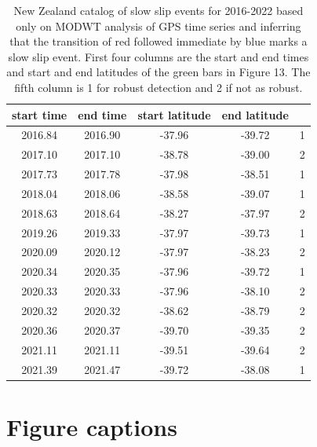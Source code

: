 \documentclass{article}
\begin{document}
 \begin{table}[hbt!]
 \caption{New Zealand catalog of slow slip events for 2016-2022 based only on MODWT analysis of GPS time series and inferring that the transition of red followed immediate by blue marks a slow slip event. First four columns are the start and end times and start and end latitudes of the green bars in Figure 13. The fifth column is 1 for robust detection and 2 if not as robust.}
 \centering
 \begin{tabular}{c c c c c}
 \hline
start time & end time & start latitude & end latitude & \\
 \hline
2016.84 & 2016.90 & -37.96 & -39.72 & 1 \\
2017.10 & 2017.10 & -38.78 & -39.00 & 2 \\
2017.73 & 2017.78 & -37.98 & -38.51 & 1 \\
2018.04 & 2018.06 & -38.58 & -39.07 & 1 \\
2018.63 & 2018.64 & -38.27 & -37.97 & 2 \\
2019.26 & 2019.33 & -37.97 & -39.73 & 1 \\
2020.09 & 2020.12 & -37.97 & -38.23 & 2 \\
2020.34 & 2020.35 & -37.96 & -39.72 & 1 \\
2020.33 & 2020.33 & -37.96 & -38.10 & 2 \\
2020.32 & 2020.32 & -38.62 & -38.79 & 2 \\
2020.36 & 2020.37 & -39.70 & -39.35 & 2 \\
2021.11 & 2021.11 & -39.51 & -39.64 & 2 \\
2021.39 & 2021.47 & -39.72 & -38.08 & 1 \\
 \hline
 \end{tabular}
 \end{table}

\clearpage

\section*{Figure captions}
\end{document}
